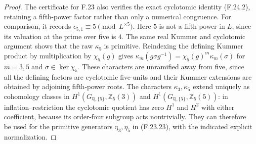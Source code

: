 \begin{proof}
The certificate for F.23 also verifies the exact
cyclotomic identity (F.24.2), retaining a fifth-power
factor rather than only a numerical congruence.
For comparison, it records
\(\epsilon_{5,1}\equiv5\pmod{L^{\times5}}\).
Here \(5\) is not a fifth power in \(L\), since its
valuation at the prime over five is \(4\).
The same real Kummer and cyclotomic argument shows
that the raw \(\kappa_5\) is primitive. Reindexing
the defining Kummer product by multiplication by
\(\chi_5(g)\) gives
\(\kappa_m(g\sigma g^{-1})=\chi_5(g)^m\kappa_m(\sigma)\)
for \(m=3,5\) and \(\sigma\in\ker\chi_5\).
These characters are unramified away from five,
since all the defining factors are cyclotomic
five-units and their Kummer extensions are obtained
by adjoining fifth-power roots. The characters
\(\kappa_3,\kappa_5\) extend uniquely as cohomology
classes in \(H^1(G_{\mathbb Q,\{5\}},\mathbb Z_5(3))\)
and \(H^1(G_{\mathbb Q,\{5\}},\mathbb Z_5(5))\):
in inflation--restriction the cyclotomic quotient
has zero \(H^1\) and \(H^2\) with either coefficient,
because its order-four subgroup acts nontrivially.
They can therefore be used for the primitive
generators \(\eta_3,\eta_5\) in (F.23.23), with
the indicated explicit normalization.
\end{proof}
